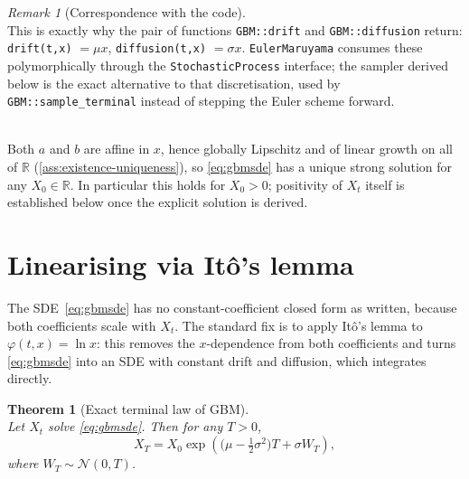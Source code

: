 \documentclass[11pt]{report}
\newcommand{\R}{\mathbb{R}}
\newcommand{\drift}{a}
\newcommand{\diff}{b}
\theoremstyle{plain}
\newtheorem{theorem}{Theorem}[chapter]
\theoremstyle{definition}
\theoremstyle{remark}
\newtheorem{remark}{Remark}[chapter]
\numberwithin{equation}{chapter}
\begin{document}
\begin{remark}[Correspondence with the code]
  \leavevmode\\
This is exactly why the pair of functions \texttt{GBM::drift} and
\texttt{GBM::diffusion} return: \texttt{drift(t,x)} $=\mu x$,
\texttt{diffusion(t,x)} $=\sigma x$. \texttt{EulerMaruyama} consumes
these polymorphically through the \texttt{StochasticProcess}
interface; the sampler derived below is the exact alternative
to that discretisation, used by \texttt{GBM::sample\_terminal} instead
of stepping the Euler scheme forward.
\end{remark}
\leavevmode\\
\noindent Both $\drift$ and $\diff$ are affine in $x$, hence globally
Lipschitz and of linear growth on all of $\R$ (\cref{ass:existence-uniqueness}),
so \eqref{eq:gbmsde} has a unique strong solution for any $X_0\in\R$. In
particular this holds for $X_0>0$; positivity of $X_t$ itself is
established below once the explicit solution is derived.

\section{Linearising via It\^o's lemma}

The SDE~\eqref{eq:gbmsde} has no constant-coefficient closed form as
written, because both coefficients scale with $X_t$. The standard fix
is to apply It\^o's lemma to $\varphi(t,x)=\ln x$: this removes the
$x$-dependence from both coefficients and turns \eqref{eq:gbmsde} into
an SDE with constant drift and diffusion, which integrates
directly.

\begin{theorem}[Exact terminal law of GBM]\label{thm:gbm-exact}
\leavevmode\\
Let $X_t$ solve \eqref{eq:gbmsde}. Then for any $T>0$,
\begin{equation}\label{eq:gbmexact}
   X_T = X_0\exp\!\left(\Big(\mu-\tfrac12\sigma^2\Big)T + \sigma W_T\right),
\end{equation}
where $W_T\sim\mathcal N(0,T)$.
\end{theorem}
\end{document}
